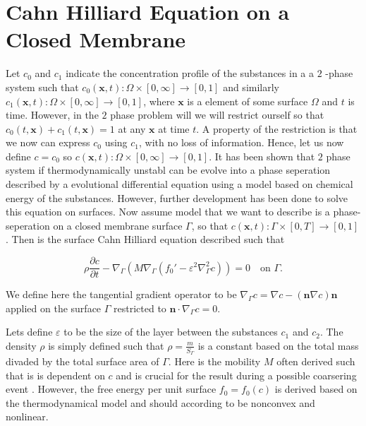 


\newpage
\section{Cahn Hilliard Equation on a Closed Membrane}%
\label{sec:cahn_hilliard_equation}


Let $c_0$ and $c_1$  indicate the concentration profile of the substances in a a $2$ -phase system such
that $c_0 \left( \mathbf{x},t \right): \Omega  \times \left[ 0, \infty \right] \to \left[ 0,1 \right]$ and
similarly $c_1 \left( \mathbf{x},t \right): \Omega \times \left[ 0, \infty \right] \to \left[ 0,1 \right]$, where
$\mathbf{x} $ is a element of some surface $\Omega $ and $t$ is time.
However, in the $2$ phase problem will we will restrict ourself so that $c_0\left( t,\mathbf{x} \right) + c_1\left( t,
\mathbf{x} \right) = 1$ at any $\mathbf{x} $ at time $t$. A property of the restriction is that we now can express
$c_0$ using $c_1$, with no loss of information. Hence, let us now define $c = c_0$ so $c \left( \mathbf{x},t \right):
\Omega  \times \left[ 0, \infty \right] \to \left[ 0,1 \right]$. It has been shown that $2$ phase system if
thermodynamically unstabl can be evolve
into a phase seperation
described by a evolutional differential equation \cite{cahnhilliard1957} using a model based on chemical energy of the
substances. However, further development has been done \cite{yushutin19} to solve this equation on surfaces. Now assume
model that we want to describe is a phase-seperation on a closed membrane surface $\Gamma $, so that $c \left( \mathbf{x},t \right):
\Gamma \times \left[ 0, T \right] \to \left[ 0,1 \right]$. Then is the surface Cahn Hilliard equation described such that

\begin{equation}
    \label{eq:cahn1}
\rho \frac{\partial c}{\partial  t}  - \nabla_{\Gamma } \left( M \nabla _{\Gamma } \left( f_{0}'  - \varepsilon ^2
        \nabla^2
_{\Gamma } c \right) \right) = 0  \quad \text{on } \Gamma
.\end{equation}

We define here the tangential gradient operator to be $\nabla _{\Gamma } c = \nabla c - \left( \mathbf{n} \nabla c
\right)\mathbf{n} $ applied on the surface $\Gamma $ restricted to $\mathbf{n} \cdot \nabla _{\Gamma } c = 0$.

Lets define $\varepsilon $ to be the size of the layer between the substances $c_{1}$ and $c_{2}$. The density $\rho $ is
simply defined such that $\rho = \frac{m}{S_{\Gamma }}$ is a constant based on the total mass divaded by the total
surface area of $\Gamma $.
Here is the mobility $M$ often derived such that is is dependent on $c$ and is crucial for the result during a possible
coarsering event \cite{yushutin19}.  However, the free energy per unit surface
$f_{0} = f_{0}\left( c \right)$ is derived based on the thermodynamical model and should according to \cite{yushutin19} be nonconvex and
nonlinear.

